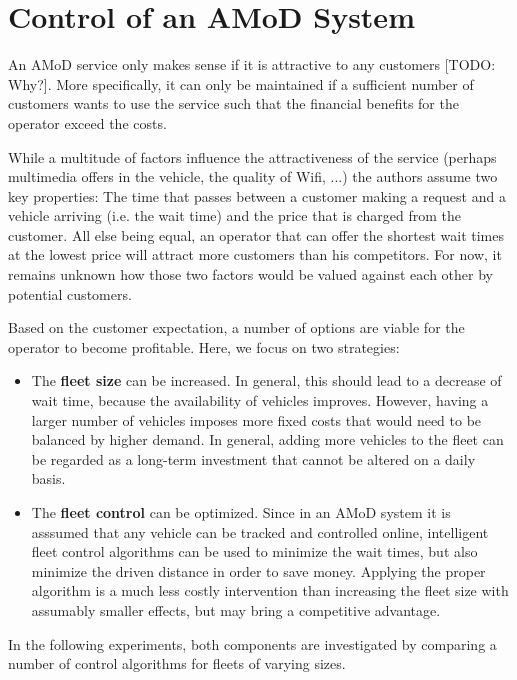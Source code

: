 \section{Control of an AMoD System}
\label{sec:background}

An AMoD service only makes sense if it is attractive to any customers [TODO: Why?].  More specifically, it can only be maintained if a sufficient number of customers wants to use the service such that the financial benefits for the operator exceed the costs.

While a multitude of factors influence the attractiveness of the service (perhaps multimedia offers in the vehicle, the quality of Wifi, ...) the authors assume two key properties: The time that passes between a customer making a request and a vehicle arriving (i.e. the wait time) and the price that is charged from the customer. All else being equal, an operator that can offer the shortest wait times at the lowest price will attract more customers than his competitors. For
now, it remains unknown how those two factors would be valued against each other by potential customers.

Based on the customer expectation, a number of options are viable for the operator to become profitable. Here, we focus on two strategies:

\begin{itemize}
\item The \textbf{fleet size} can be increased. In general, this should lead to a decrease of wait time, because the availability of vehicles improves. However, having a larger number of vehicles imposes more fixed costs that would need to be balanced by higher demand. In general, adding more vehicles to the fleet can be regarded as a long-term investment that cannot be altered on a daily basis.
\item The \textbf{fleet control} can be optimized. Since in an AMoD system it is asssumed that any vehicle can be tracked and controlled online, intelligent fleet control algorithms can be used to minimize the wait times, but also minimize the driven distance in order to save money. Applying the proper algorithm is a much less costly intervention than increasing the fleet size with assumably smaller
effects, but may bring a competitive advantage.
\end{itemize}

In the following experiments, both components are investigated by comparing a number of control algorithms for fleets of varying sizes.

